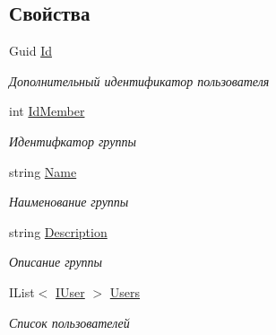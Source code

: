 \subsection*{Свойства}
\begin{DoxyCompactItemize}
\item 
Guid \hyperlink{interface_security_1_1_interfaces_1_1_model_1_1_i_group_a09109d97ecc01c2cf087b05601fd6e94}{Id}
\begin{DoxyCompactList}\small\item\em Дополнительный идентификатор пользователя \end{DoxyCompactList}\item 
int \hyperlink{interface_security_1_1_interfaces_1_1_model_1_1_i_group_ab5b5e0153d2ffc0a94baad4c52bd1b1b}{Id\+Member}
\begin{DoxyCompactList}\small\item\em Идентифкатор группы \end{DoxyCompactList}\item 
string \hyperlink{interface_security_1_1_interfaces_1_1_model_1_1_i_group_a061a1543ccf90cf6a5af6684a1f37988}{Name}
\begin{DoxyCompactList}\small\item\em Наименование группы \end{DoxyCompactList}\item 
string \hyperlink{interface_security_1_1_interfaces_1_1_model_1_1_i_group_a200d224ac6544e86cc69336e0d047c1a}{Description}
\begin{DoxyCompactList}\small\item\em Описание группы \end{DoxyCompactList}\item 
I\+List$<$ \hyperlink{interface_security_1_1_interfaces_1_1_model_1_1_i_user}{I\+User} $>$ \hyperlink{interface_security_1_1_interfaces_1_1_model_1_1_i_group_a5b0fa019ebbaad5398f96af0b3e1ab32}{Users}
\begin{DoxyCompactList}\small\item\em Список пользователей \end{DoxyCompactList}\end{DoxyCompactItemize}


